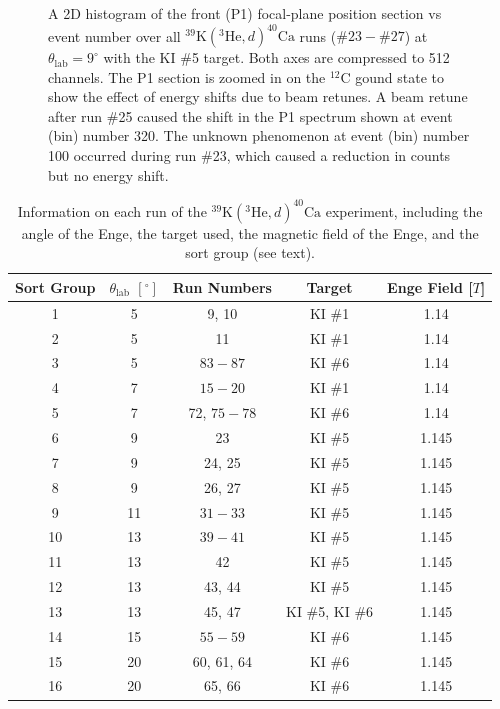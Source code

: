\begin{figure}[t]
\begin{tikzpicture}[scale=1.12, every node/.style={transform shape}]
\end{tikzpicture}
\caption{\label{fig:9deg_P1vsEvt}A 2D histogram of the front (P1) focal-plane position section vs event number over all $^{39}\mathrm{K}(^{3}\mathrm{He},d)^{40}\mathrm{Ca}$ runs ($\#23-\#27$) at $\theta_{\mathrm{lab}} = 9^{\circ}$ with the KI $\#$5 target. Both axes are compressed to 512 channels. The P1 section is zoomed in on the $^{12}$C gound state to show the effect of energy shifts due to beam retunes. A beam retune after run $\#$25 caused the shift in the P1 spectrum shown at event (bin) number 320. The unknown phenomenon at event (bin) number 100 occurred during run $\#$23, which caused a reduction in counts but no energy shift.}
\end{figure}

\begin{table}[t]
\centering
\caption{\label{tab:run}Information on each run of the $^{39}\mathrm{K}(^{3}\mathrm{He}, d)^{40}\mathrm{Ca}$ experiment, including the angle of the Enge, the target used, the magnetic field of the Enge, and the sort group (see text).}
\begin{tabular}{ccccc}
\hline\midrule
Sort Group&$\theta_{\mathrm{lab}}$ $[^{\circ}]$&Run Numbers&Target&Enge Field [$T$]\\ \midrule
1&5&9, 10&KI $\#$1&1.14\\
2&5&11&KI $\#$1&1.14\\
3&5&$83-87$&KI $\#$6&1.14\\
4&7&$15-20$&KI $\#$1&1.14\\
5&7&72, $75-78$&KI $\#$6&1.14\\
6&9&23&KI $\#$5&1.145\\
7&9&24, 25&KI $\#$5&1.145\\
8&9&26, 27&KI $\#$5&1.145\\
9&11&$31-33$&KI $\#$5&1.145\\
10&13&$39-41$&KI $\#$5&1.145\\
11&13&42&KI $\#$5&1.145\\
12&13&43, 44&KI $\#$5&1.145\\
13&13&45, 47&KI $\#$5, KI $\#$6&1.145\\
14&15&$55-59$&KI $\#$6&1.145\\
15&20&60, 61, 64&KI $\#$6&1.145\\
16&20&65, 66&KI $\#$6&1.145\\
\hline\hline
\end{tabular}
\end{table}

